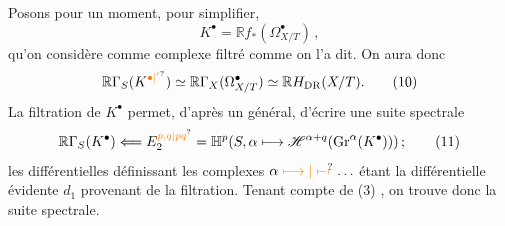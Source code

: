 Posons pour un moment, pour simplifier,
\[
 K^\bullet=\mathbb R f_*(\Omega^\bullet_{X/T}) \,, \tag*{(9)}
\]
qu'on considère comme complexe filtré comme on l'a dit. On aura donc
\[
 \mathbb R\Gamma_S(K^{\unsure{\bullet|'}})\simeq\mathbb R\Gamma_X(\Omega^\bullet_{X/T})\simeq\mathbb RH_{\mathrm{DR}}(X/T). \tag*{(10)}
\]
La filtration de $K^\bullet$ permet, d'après un  général, d'écrire une suite spectrale
\[
 \mathbb R\Gamma_S(K^\bullet)\Longleftarrow E^{\unsure{p,q|pq}}_2=\mathbb H^p(S,\alpha\longmapsto\mathscr H^{\alpha+q}(\mathrm{Gr}^\alpha(K^\bullet))) \,; \tag*{(11)}
\]
les différentielles définissant les complexes $\alpha\mathrel{\unsure{\longmapsto|\mapstochar\relbar\mapstochar}}\ldots$ étant la différentielle évidente $d_1$ provenant de la filtration. Tenant compte de (3) , on trouve donc la suite spectrale.
